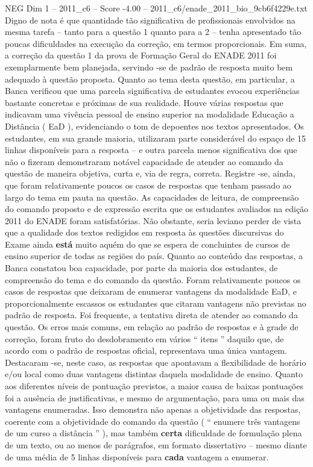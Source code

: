\begin{textsample}{NEG Dim 1 – 2011\_c6 – Score -4.00 – 2011\_c6/enade\_2011\_bio\_9cb6f4229e.txt}
Digno de nota é que quantidade tão significativa de profissionais envolvidos na mesma tarefa – tanto para a questão 1 quanto para a 2 – tenha apresentado tão poucas dificuldades na execução da correção, em termos proporcionais.
Em suma, a correção da questão 1 da prova de Formação Geral do ENADE 2011 foi exemplarmente bem planejada, servindo -se de padrão de resposta muito bem adequado à questão proposta.
Quanto ao tema desta questão, em particular, a Banca verificou que uma parcela significativa de estudantes evocou experiências bastante concretas e próximas de sua realidade.
Houve várias respostas que indicavam uma vivência pessoal de ensino superior na modalidade Educação a Distância ( EaD ), evidenciando o tom de depoentes nos textos apresentados.
Os estudantes, em sua grande maioria, utilizaram parte considerável do espaço de 15 linhas disponíveis para a resposta – e outra parcela menos significativa dos que não o fizeram demonstraram notável capacidade de atender ao comando da questão de maneira objetiva, curta e, via de regra, correta.
Registre -se, ainda, que foram relativamente poucos os casos de respostas que tenham passado ao largo do tema em pauta na questão.
As capacidades de leitura, de compreensão do comando proposto e de expressão escrita que os estudantes avaliados na edição 2011 do ENADE foram satisfatórias.
Não obstante, seria leviano perder de vista que a qualidade dos textos redigidos em resposta às questões discursivas do Exame ainda \textbf{está} muito aquém do que se espera de concluintes de cursos de ensino superior de todas as regiões do país.
Quanto ao conteúdo das respostas, a Banca constatou boa capacidade, por parte da maioria dos estudantes, de compreensão do tema e do comando da questão.
Foram relativamente poucos os casos de respostas que deixaram de enumerar vantagens da modalidade EaD, e proporcionalmente escassos os estudantes que citaram vantagens não previstas no padrão de resposta.
Foi frequente, a tentativa direta de atender ao comando da questão.
Os erros mais comuns, em relação ao padrão de respostas e à grade de correção, foram fruto do desdobramento em vários “ itens ” daquilo que, de acordo com o padrão de respostas oficial, representava uma única vantagem.
Destacaram -se, neste caso, as respostas que apontavam a flexibilidade de horário e/ou local como duas vantagens distintas daquela modalidade de ensino.
Quanto aos diferentes níveis de pontuação previstos, a maior causa de baixas pontuações foi a ausência de justificativas, e mesmo de argumentação, para uma ou mais das vantagens enumeradas.
Isso demonstra não apenas a objetividade das respostas, coerente com a objetividade do comando da questão ( “ enumere três vantagens de um curso a distância ” ), mas também \textbf{certa} dificuldade de formulação plena de um texto, ou ao menos de parágrafos, em formato dissertativo – mesmo diante de uma média de 5 linhas disponíveis para \textbf{cada} vantagem a enumerar.

\end{textsample}
